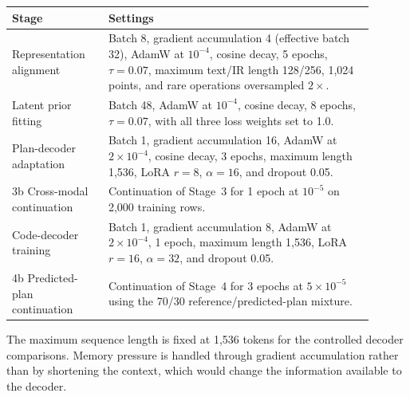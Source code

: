 \documentclass[preprint,12pt]{elsarticle}
\begin{document}
\begin{center}
  \footnotesize
  \setlength{\tabcolsep}{4pt}

  \begin{tabular}{
      >{\raggedright\arraybackslash}p{0.24\linewidth}
      >{\raggedright\arraybackslash}p{0.66\linewidth}
    }
    \toprule
    Stage & Settings                                                        \\
    \midrule

    1 Representation alignment
          & Batch 8, gradient accumulation 4 (effective batch 32), AdamW at
    $10^{-4}$, cosine decay, 5 epochs, $\tau=0.07$, maximum text/IR
    length 128/256, 1,024 points, and rare operations oversampled
    $2\times$.                                                              \\

    2 Latent prior fitting
          & Batch 48, AdamW at $10^{-4}$, cosine decay, 8 epochs,
    $\tau=0.07$, with all three loss weights set to 1.0.                    \\

    3 Plan-decoder adaptation
          & Batch 1, gradient accumulation 16, AdamW at $2\times10^{-4}$,
    cosine decay, 3 epochs, maximum length 1,536, LoRA $r=8$,
    $\alpha=16$, and dropout 0.05.                                          \\

    3b Cross-modal continuation
          & Continuation of Stage~3 for 1 epoch at $10^{-5}$ on
    2,000 training rows.                                                    \\

    4 Code-decoder training
          & Batch 1, gradient accumulation 8, AdamW at $2\times10^{-4}$,
    1 epoch, maximum length 1,536, LoRA $r=16$, $\alpha=32$,
    and dropout 0.05.                                                       \\

    4b Predicted-plan continuation
          & Continuation of Stage~4 for 3 epochs at $5\times10^{-5}$ using
    the 70/30 reference/predicted-plan mixture.                             \\

    \bottomrule
  \end{tabular}
\end{center}

The maximum sequence length is fixed at 1,536 tokens for the controlled decoder
comparisons. Memory pressure is handled through gradient accumulation rather
than by shortening the context, which would change the information available
to the decoder.
\end{document}
